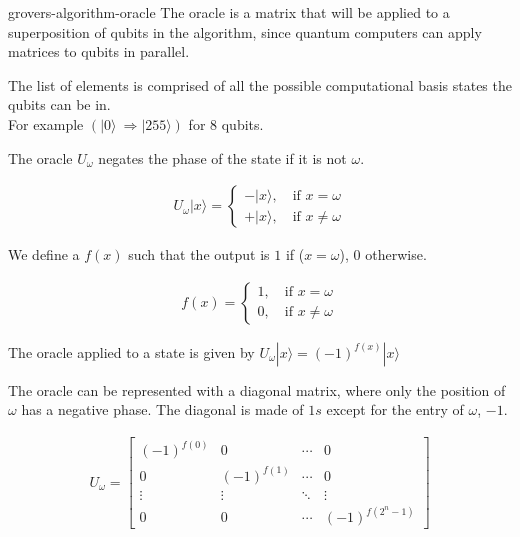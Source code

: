 \documentclass[preview]{standalone}
\begin{document}
\begin{snippet}{grovers-algorithm-oracle}
    The oracle is a matrix that will be applied to a superposition of qubits in the algorithm, since quantum computers can apply matrices to qubits in parallel.

    The list of elements is comprised of all the possible computational basis states the qubits can be in.\\
    For example \((|0\rangle\ \Rightarrow |255\rangle)\) for 8 qubits.

    The oracle \(U_\omega\) negates the phase of the state if it is not \(\omega\).

    \begin{align*}
        U_\omega|x\rangle=
        \begin{cases}
            -|x\rangle,\quad \text{if } x=\omega \\
            +|x\rangle,\quad \text{if } x\neq\omega
        \end{cases}
    \end{align*}

    We define a \function \(f(x)\) such that the output is \(1\) if (\(x=\omega\)), \(0\) otherwise.

    \begin{align*}
        f(x)=
        \begin{cases}
            1,\quad \text{if } x=\omega \\
            0,\quad \text{if } x\neq\omega
        \end{cases}
    \end{align*}

    The oracle applied to a state is given by \(U_\omega|x\rangle ={(-1)}^{f(x)}|x\rangle\)

    The oracle can be represented with a diagonal matrix, where only the position of \(\omega\) has a negative phase.
    The diagonal is made of \(1s\) except for the entry of \(\omega\), \(-1\).

    \begin{align*}
        U_\omega=
        \begin{bmatrix}
            {(-1)}^{f(0)} & 0 & \cdots & 0 \\
            0 & {(-1)}^{f(1)} & \cdots & 0 \\
            \vdots & \vdots & \ddots & \vdots \\
            0 & 0 & \cdots & {(-1)}^{f(2^n-1)}
        \end{bmatrix}
    \end{align*}
\end{snippet}
\end{document}
